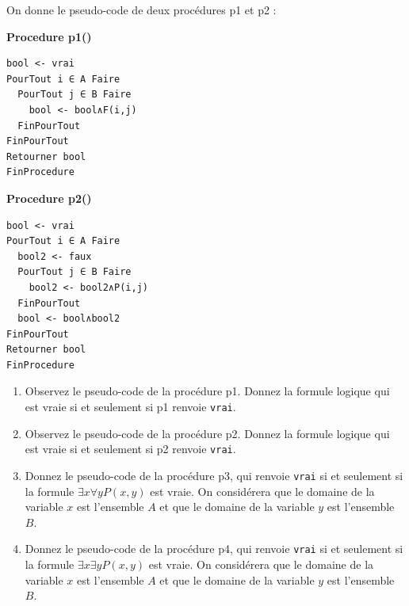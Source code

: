 \documentclass[a4paper,11pt]{article}
\begin{document}
On donne le pseudo-code de deux procédures p1 et p2 :

\begin{minipage}[t]{0.48\textwidth}
\textbf{Procedure p1()}
\begin{lstlisting}
bool <- vrai
PourTout i ∈ A Faire
  PourTout j ∈ B Faire
    bool <- bool∧F(i,j)
  FinPourTout
FinPourTout
Retourner bool
FinProcedure
\end{lstlisting}
\end{minipage}
\hfill
\begin{minipage}[t]{0.48\textwidth}
\textbf{Procedure p2()}
\begin{lstlisting}
bool <- vrai
PourTout i ∈ A Faire
  bool2 <- faux
  PourTout j ∈ B Faire
    bool2 <- bool2∧P(i,j)
  FinPourTout
  bool <- bool∧bool2
FinPourTout
Retourner bool
FinProcedure
\end{lstlisting}
\end{minipage}

\vspace{0.5cm}

\begin{enumerate}
\item Observez le pseudo-code de la procédure p1. Donnez la formule logique qui est vraie si et seulement si p1 renvoie \texttt{vrai}.

\item Observez le pseudo-code de la procédure p2. Donnez la formule logique qui est vraie si et seulement si p2 renvoie \texttt{vrai}.

\item Donnez le pseudo-code de la procédure p3, qui renvoie \texttt{vrai} si et seulement si la formule $\exists x \forall y P(x,y)$ est vraie. On considérera que le domaine de la variable $x$ est l'ensemble $A$ et que le domaine de la variable $y$ est l'ensemble $B$.

\item Donnez le pseudo-code de la procédure p4, qui renvoie \texttt{vrai} si et seulement si la formule $\exists x \exists y P(x,y)$ est vraie. On considérera que le domaine de la variable $x$ est l'ensemble $A$ et que le domaine de la variable $y$ est l'ensemble $B$.
\end{enumerate}
\end{document}
